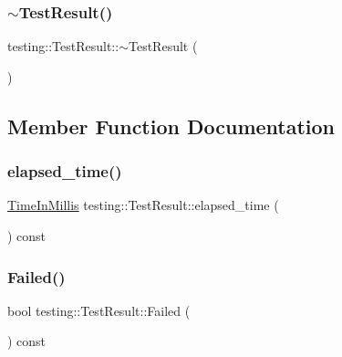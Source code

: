 \mbox{\label{classtesting_1_1TestResult_a41f407680b725b75d7eadc3230bc3315}} 
\subsubsection{\texorpdfstring{$\sim$TestResult()}{~TestResult()}}
{\footnotesize\ttfamily testing\+::\+Test\+Result\+::$\sim$\+Test\+Result (\begin{DoxyParamCaption}{ }\end{DoxyParamCaption})}



\subsection{Member Function Documentation}
\mbox{\label{classtesting_1_1TestResult_a717e05e00d4af5cb809433e343ab63af}} 
\subsubsection{\texorpdfstring{elapsed\_time()}{elapsed\_time()}}
{\footnotesize\ttfamily \mbox{\hyperlink{namespacetesting_a992de1d091ce660f451d1e8b3ce30fd6}{Time\+In\+Millis}} testing\+::\+Test\+Result\+::elapsed\+\_\+time (\begin{DoxyParamCaption}{ }\end{DoxyParamCaption}) const\hspace{0.3cm}{\ttfamily [inline]}}

\mbox{\label{classtesting_1_1TestResult_afacc37e8b43c8574e4101bc61723c769}} 
\subsubsection{\texorpdfstring{Failed()}{Failed()}}
{\footnotesize\ttfamily bool testing\+::\+Test\+Result\+::\+Failed (\begin{DoxyParamCaption}{ }\end{DoxyParamCaption}) const}

